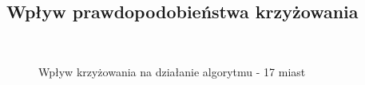 \documentclass[12pt, a4paper]{article}
\begin{document}
\subsection{Wpływ prawdopodobieństwa krzyżowania}
\begin{figure}[H]
\centering
\mbox{\quad
{} 
}
\caption{Wpływ krzyżowania na działanie algorytmu - 17 miast}
\end{figure}
\end{document}
